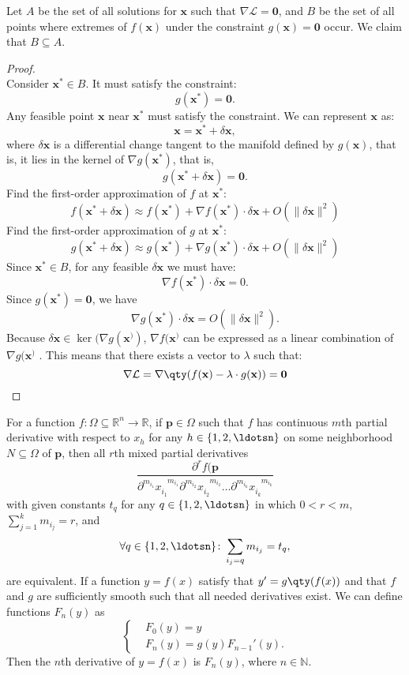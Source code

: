 \documentclass[a4paper,12pt]{report}
\begin{document}
 Let $A$ be the set of all solutions for \( \mathbf{x} \) such that $\nabla \mathcal{L} = \mathbf{0}$, and $B$ be the set of all points where extremes of \( f(\mathbf{x}) \) under the constraint \( g(\mathbf{x}) = \mathbf{0}\) occur. We claim that $B\subseteq A$.
\begin{proof}\mbox{}\\
Consider $\mathbf{x}^*\in B$. It must satisfy the constraint:
\[g(\mathbf{x}^*) = \mathbf{0}.\]
Any feasible point $\mathbf{x}$ near $\mathbf{x}^*$ must satisfy the constraint. We can represent $\mathbf{x}$ as:
\[\mathbf{x} = \mathbf{x}^* + \delta\mathbf{x},\]
where $\delta\mathbf{x}$ is a differential change tangent to the manifold defined by $g(\mathbf{x})$, that is, it lies in the kernel of $\nabla g(\mathbf{x}^*)$, that is,
\[g(\mathbf{x}^* + \delta\mathbf{x}) = \mathbf{0}.\]
Find the first-order approximation of $f$ at $\mathbf{x}^*$:
\[f(\mathbf{x}^*+ \delta\mathbf{x}) \approx f(\mathbf{x}^*) + \nabla f(\mathbf{x}^*) \cdot \delta\mathbf{x} + O(\|\delta\mathbf{x}\|^2)\]
Find the first-order approximation of $g$ at $\mathbf{x}^*$:
\[g(\mathbf{x}^*+ \delta\mathbf{x}) \approx g(\mathbf{x}^*) + \nabla g(\mathbf{x}^*) \cdot \delta\mathbf{x} + O(\|\delta\mathbf{x}\|^2)\]
Since $\mathbf{x}^*\in B$, for any feasible $\delta\mathbf{x}$ we must have:
\[\nabla f(\mathbf{x}^*) \cdot \delta\mathbf{x} = 0.\]
Since $g(\mathbf{x}^*) = \mathbf{0}$, we have
\[\nabla g(\mathbf{x}^*) \cdot \delta\mathbf{x} = O(\|\delta\mathbf{x}\|^2).\]
Because \( \delta\mathbf{x} \in \ker(\nabla g(\mathbf{x}^)) \), \( \nabla f(\mathbf{x}^) \) can be expressed as a linear combination of \( \nabla g(\mathbf{x}^) \) . This means that there exists a vector to $\lambda$ such that:
\[\nabla\mathcal{L} = \nabla \qty(f(\mathbf{x}) - \lambda \cdot g(\mathbf{x})) = \mathbf{0} \]
\end{proof}
For a function $f\colon\Omega\subseteq\mathbb{R}^n\to\mathbb{R}$, if $\mathbf{p}\in\Omega$ such that $f$ has continuous $m$th partial derivative with respect to $x_h$ for any $h\in\{1,2,\ldotsn\}$ on some neighborhood $N\subseteq\Omega$ of $\mathbf{p}$, then all $r$th mixed partial derivatives \[\frac{\partial^r f(\mathbf{p}}{\partial^{m_{i_1}}x_{i_1}^{\phantom{i_1}m_{i_1}}\partial^{m_{i_2}}x_{i_2}^{\phantom{i_2}m_{i_2}}\ldots\partial^{m_{i_k}}x_{i_k}^{\phantom{i_k}m_{i_k}}}\]
with given constants $t_q$ for any $q\in\{1,2,\ldotsn\}$ in which $0<r<m$, $\sum_{j=1}^km_{i_j}=r$, and
\[\forall q\in\{1,2,\ldotsn\}\colon\sum_{i_j=q}m_{i_j}=t_q,\]
are equivalent.
If a function $y=f(x)$ satisfy that $y'=g\qty(f(x))$ and that $f$ and $g$ are sufficiently smooth such that all needed derivatives exist. We can define functions $F_n(y)$ as
\[\begin{cases}
&F_0(y)=y\\
&F_n(y)=g(y)F_{n-1}'(y).
\end{cases}\]
Then the $n$th derivative of $y=f(x)$ is $F_n(y)$, where $n\in\mathbb{N}$.
\end{document}
